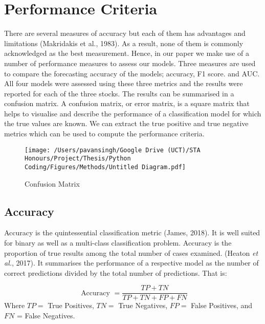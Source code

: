 
\section{Performance Criteria}

There are several measures of accuracy but each of them has advantages and limitations (Makridakis et al., 1983). As a result, none of them is commonly acknowledged as the best measurement. Hence, in our paper we make use of a number of performance measures to assess our models. Three measures are used to compare the forecasting accuracy of the models;  accuracy, F1 score. and AUC. All four models were assessed using these three metrics and the results were reported for each of the three stocks. The results can be summarised in a confusion matrix. A confusion matrix, or error matrix, is a square matrix that helps to visualise and describe the performance of a classification model for which the true values are known. We can extract the true positive and true negative metrics which can be used to compute the performance criteria. 

\begin{figure}[h]
\centering
  \texttt{[image: /Users/pavansingh/Google Drive (UCT)/STA Honours/Project/Thesis/Python Coding/Figures/Methods/Untitled Diagram.pdf]}
  \caption{Confusion Matrix}
  \label{}
\end{figure}

\subsection{Accuracy}
Accuracy is the quintessential classification metric (James, 2018). It is well suited for binary as well as a multi-class classification problem. Accuracy is the proportion of true results among the total number of cases examined. (Heaton \textit{et al.}, 2017). It summarises the performance of a respective model as the number of correct predictions divided by the total number of predictions. That is:

\begin{equation}
\text { Accuracy }=\frac{T P+T N}{T P+T N+F P+F N}
\end{equation}
Where $T P=$ True Positives, $T N=$ True Negatives, $F P=$ False Positives, and $F N$ = False Negatives.

